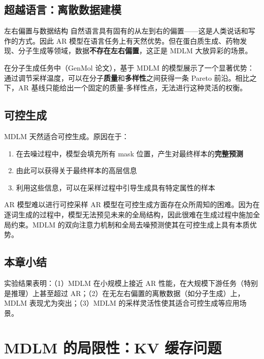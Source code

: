\documentclass[a4paper]{article}
\begin{document}
\subsection{超越语言：离散数据建模}

\begin{knowledgebox}{左右偏置与数据结构}
自然语言具有固有的从左到右的偏置——这是人类说话和写作的方式。因此 AR 模型在语言任务上有天然优势。但在蛋白质生成、药物发现、分子生成等领域，数据\textbf{不存在左右偏置}，这正是 MDLM 大放异彩的场景。
\end{knowledgebox}

在分子生成任务中（GenMol 论文），基于 MDLM 的模型展示了一个显著优势：通过调节采样温度，可以在分子\textbf{质量}和\textbf{多样性}之间获得一条 Pareto 前沿。相比之下，AR 基线只能给出一个固定的质量-多样性点，无法进行这种灵活的权衡。

\subsection{可控生成}

MDLM 天然适合可控生成。原因在于：

\begin{enumerate}
    \item 在去噪过程中，模型会填充所有 mask 位置，产生对最终样本的\textbf{完整预测}
    \item 由此可以获得关于最终样本的高层信息
    \item 利用这些信息，可以在采样过程中引导生成具有特定属性的样本
\end{enumerate}

\begin{warningbox}{AR 模型难以进行可控采样}
AR 模型在可控生成方面存在众所周知的困难。因为在逐词生成的过程中，模型无法预见未来的全局结构，因此很难在生成过程中施加全局约束。MDLM 的双向注意力机制和全局去噪预测使其在可控生成上具有本质优势。
\end{warningbox}

\subsection{本章小结}

实验结果表明：（1）MDLM 在小规模上接近 AR 性能，在大规模下游任务（特别是推理）上甚至超过 AR；（2）在无左右偏置的离散数据（如分子生成）上，MDLM 表现尤为突出；（3）MDLM 的采样灵活性使其适合可控生成等应用场景。

\newpage
\section{MDLM 的局限性：KV 缓存问题}
\end{document}
